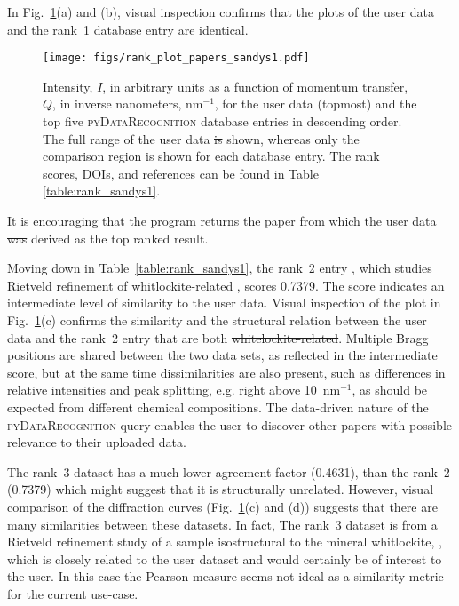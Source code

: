 \documentclass[preprint]{iucr}
\newcommand{\fig}[1]{Fig.~\ref{fig:#1}}
\newcommand{\tabl}[1]{Table~\ref{table:#1}}
\newcommand{\pydr}{\textsc{pyDataRecognition}\xspace}
\providecommand{\DIFadd}[1]{{\protect\color{blue}\uwave{#1}}} %
\providecommand{\DIFdel}[1]{{\protect\color{red}\sout{#1}}}                      %
\providecommand{\DIFaddbegin}{} %
\providecommand{\DIFaddend}{} %
\providecommand{\DIFdelbegin}{} %
\providecommand{\DIFdelend}{} %
\providecommand{\DIFaddFL}[1]{\DIFadd{#1}} %
\providecommand{\DIFdelFL}[1]{\DIFdel{#1}} %
\providecommand{\DIFaddbeginFL}{} %
\providecommand{\DIFaddendFL}{} %
\providecommand{\DIFdelbeginFL}{} %
\providecommand{\DIFdelendFL}{} %
\newcommand{\DIFscaledelfig}{0.5}
\newlength{\DIFdelgraphicswidth} %
\newlength{\DIFdelgraphicsheight} %
\newcommand{\DIFaddincludegraphics}[2][]{{\color{blue}\fbox{\DIFOincludegraphics[#1]{#2}}}} %
\newcommand{\DIFdelincludegraphics}[2][]{%
\sbox{\DIFdelgraphicsbox}{\DIFOincludegraphics[#1]{#2}}%
\settoboxwidth{\DIFdelgraphicswidth}{\DIFdelgraphicsbox} %
\settoboxtotalheight{\DIFdelgraphicsheight}{\DIFdelgraphicsbox} %
\scalebox{\DIFscaledelfig}{%
\parbox[b]{\DIFdelgraphicswidth}{\usebox{\DIFdelgraphicsbox}\\[-\baselineskip] \rule{\DIFdelgraphicswidth}{0em}}\llap{\resizebox{\DIFdelgraphicswidth}{\DIFdelgraphicsheight}{%
\setlength{\unitlength}{\DIFdelgraphicswidth}%
\begin{picture}(1,1)%
\thicklines\linethickness{2pt} %
{\color[rgb]{1,0,0}\put(0,0){\framebox(1,1){}}}%
{\color[rgb]{1,0,0}\put(0,0){\line( 1,1){1}}}%
{\color[rgb]{1,0,0}\put(0,1){\line(1,-1){1}}}%
\end{picture}%
}\hspace*{3pt}}} %
} %
\DeclareRobustCommand{\DIFaddbegin}{\DIFOaddbegin \let\includegraphics\DIFaddincludegraphics} %
\DeclareRobustCommand{\DIFaddend}{\DIFOaddend \let\includegraphics\DIFOincludegraphics} %
\DeclareRobustCommand{\DIFdelbegin}{\DIFOdelbegin \let\includegraphics\DIFdelincludegraphics} %
\DeclareRobustCommand{\DIFdelend}{\DIFOaddend \let\includegraphics\DIFOincludegraphics} %
\DeclareRobustCommand{\DIFaddbeginFL}{\DIFOaddbeginFL \let\includegraphics\DIFaddincludegraphics} %
\DeclareRobustCommand{\DIFaddendFL}{\DIFOaddendFL \let\includegraphics\DIFOincludegraphics} %
\DeclareRobustCommand{\DIFdelbeginFL}{\DIFOdelbeginFL \let\includegraphics\DIFdelincludegraphics} %
\DeclareRobustCommand{\DIFdelendFL}{\DIFOaddendFL \let\includegraphics\DIFOincludegraphics} %
\begin{document}
%
\DIFdelbegin %
\DIFdelend In \fig{rank_plot_sandys1}(a) and (b), visual inspection confirms that the plots of the user data and the rank~1 database entry are identical. 
%
\begin{figure}
    \texttt{[image: figs/rank\_plot\_papers\_sandys1.pdf]}
    \label{fig:rank_plot_sandys1}
    \caption{Intensity, $I$, in arbitrary units as a function of momentum transfer, $Q$, in inverse nanometers, $\mathrm{nm}^{-1}$, for the user data (topmost) and the top five \pydr database entries in descending order.
    The full range of the user data \DIFdelbeginFL \DIFdelFL{is }\DIFdelendFL \DIFaddbeginFL \DIFaddFL{are }\DIFaddendFL shown, whereas only the comparison region is shown for each database entry.
    The rank scores, DOIs, and references can be found in Table \ref{table:rank_sandys1}.}
\end{figure}
%
It is encouraging that the program returns the paper from which the user data \DIFdelbegin \DIFdel{was }\DIFdelend \DIFaddbegin \DIFadd{were }\DIFaddend derived as the top ranked result. 

Moving down in \tabl{rank_sandys1}, the rank~2 entry \cite{zatovskyRietveldRefinementWhitlockiterelated2010}, which studies Rietveld refinement of whitlockite-related , scores 0.7379. The score indicates an intermediate level of similarity to the user data.  Visual inspection of the plot in \fig{rank_plot_sandys1}(c) confirms the similarity and the structural relation between the user data and the rank~2 entry that are both \DIFdelbegin \DIFdel{whitelockite-related}\DIFdelend \DIFaddbegin \DIFadd{whitlockite-related}\DIFaddend . Multiple Bragg positions are shared between the two data sets, as reflected in the intermediate score, but at the same time dissimilarities are also present, such as differences in relative intensities and peak splitting, e.g. right above 10~nm$^{-1}$, as should be expected from different chemical compositions. The data-driven nature of the \pydr query enables the user to discover other papers with possible relevance to their uploaded data. 

The rank~3 dataset has a much lower agreement factor (0.4631), than the rank~2 (0.7379) which might suggest that it is structurally unrelated.  However, visual comparison of the diffraction curves (\fig{rank_plot_sandys1}(c) and (d)) suggests that there are many similarities between these datasets.  In fact, The rank~3 dataset \cite{strutynskaRietveldRefinementAgCa102013} is from a Rietveld refinement study of  a sample isostructural to the mineral whitlockite, , which is closely related to the user dataset and would certainly be of interest to the user. In this case the Pearson measure seems not ideal as a similarity metric for the current use-case.
\end{document}

